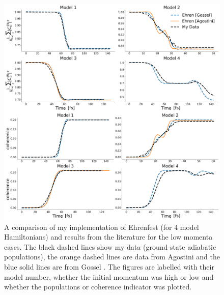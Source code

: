 \begin{figure}[ht]
	\includegraphics[width=\textwidth]{../img/CTMQC/TullyModels/Ehren_lowMom.png}
	\caption{\label{fig:LitCompEhrenTullyLow}A comparison of my implementation of Ehrenfest (for 4 model Hamiltonians) and results from the literature for the low momenta cases. The black dashed lines show my data (ground state adiabatic populations), the orange dashed lines are data from Agostini \cite{agostini_quantum-classical_2016} and the blue solid lines are from Gossel \cite{gossel_coupled-trajectory_2018}. The figures are labelled with their model number, whether the initial momentum was high or low and whether the populations or coherence indicator was plotted.}
\end{figure}
